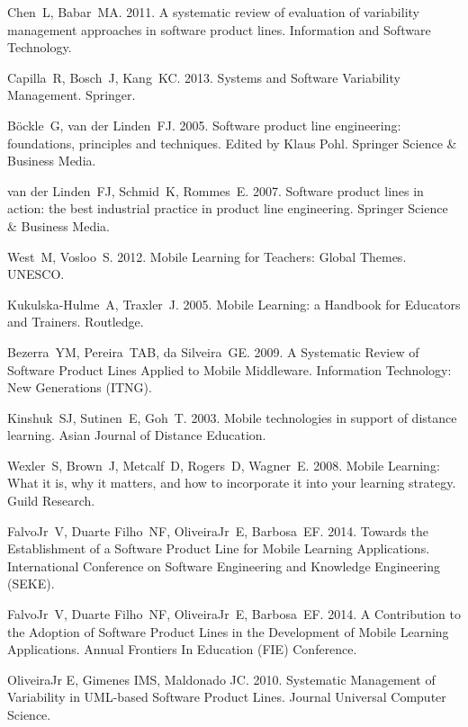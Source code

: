 \documentclass[preprint,12pt]{elsarticle}
\begin{document}
\begin{thebibliography}{33}


 Chen~L, Babar~MA. 2011. A systematic review of evaluation of variability management approaches in software product lines. Information and Software Technology.

 Capilla~R, Bosch~J, Kang~KC. 2013. Systems and Software Variability Management. Springer.

 B\"{o}ckle~G, van der Linden~FJ. 2005. Software product line engineering: foundations, principles and techniques. Edited by Klaus Pohl. Springer Science \& Business Media.

 van der Linden~FJ, Schmid~K, Rommes~E. 2007. Software product lines in action: the best industrial practice in product line engineering. Springer Science \& Business Media.

 West~M, Vosloo~S. 2012. Mobile Learning for Teachers: Global Themes. UNESCO.

 Kukulska-Hulme~A, Traxler~J. 2005. Mobile Learning: a Handbook for Educators and Trainers. Routledge.

 Bezerra~YM, Pereira~TAB, da Silveira~GE. 2009. A Systematic Review of Software Product Lines Applied to Mobile Middleware. Information Technology: New Generations (ITNG).

 Kinshuk~SJ, Sutinen~E, Goh~T. 2003. Mobile technologies in support of distance learning. Asian Journal of Distance Education.

 Wexler~S, Brown~J, Metcalf~D, Rogers~D, Wagner~E. 2008. Mobile Learning: What it is, why it matters, and how to incorporate it into your learning strategy. Guild Research.

 FalvoJr~V, Duarte Filho~NF, OliveiraJr~E, Barbosa~EF. 2014. Towards the Establishment of a Software Product Line for Mobile Learning Applications. International Conference on Software Engineering and Knowledge Engineering (SEKE).

 FalvoJr~V, Duarte Filho~NF, OliveiraJr~E, Barbosa~EF. 2014. A Contribution to the Adoption of Software Product Lines in the Development of Mobile Learning Applications. Annual Frontiers In Education (FIE) Conference.

 OliveiraJr E, Gimenes IMS, Maldonado JC. 2010. Systematic Management of Variability in UML-based Software Product Lines. Journal Universal Computer Science.


\end{thebibliography}
\end{document}
